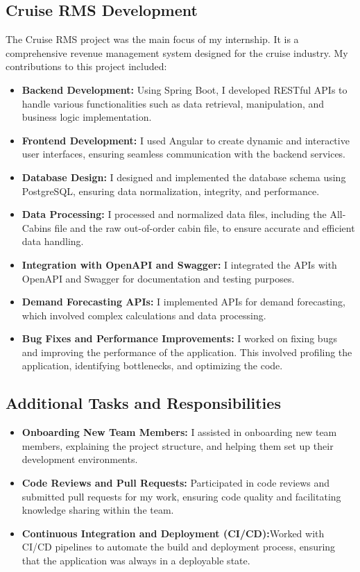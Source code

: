 \documentclass[openany, 11pt]{report} %
\begin{document}
\subsection{Cruise RMS Development}
The Cruise RMS project was the main focus of my internship. It is a comprehensive revenue management system designed for the cruise industry. My contributions to this project included:
\begin{itemize}
    \item \textbf{Backend Development:} Using Spring Boot, I developed RESTful APIs to handle various functionalities such as data retrieval, manipulation, and business logic implementation.
    \item \textbf{Frontend Development:} I used Angular to create dynamic and interactive user interfaces, ensuring seamless communication with the backend services.
    \item \textbf{Database Design:} I designed and implemented the database schema using PostgreSQL, ensuring data normalization, integrity, and performance.
    \item \textbf{Data Processing:} I processed and normalized data files, including the All-Cabins file and the raw out-of-order cabin file, to ensure accurate and efficient data handling.
    \item \textbf{Integration with OpenAPI and Swagger:} I integrated the APIs with OpenAPI and Swagger for documentation and testing purposes.
    \item \textbf{Demand Forecasting APIs:} I implemented APIs for demand forecasting, which involved complex calculations and data processing.
    \item \textbf{Bug Fixes and Performance Improvements:} I worked on fixing bugs and improving the performance of the application. This involved profiling the application, identifying bottlenecks, and optimizing the code.
\end{itemize}

\subsection{Additional Tasks and Responsibilities}
\begin{itemize}
    \item \textbf{Onboarding New Team Members:} I assisted in onboarding new team members, explaining the project structure, and helping them set up their development environments.
    \item \textbf{Code Reviews and Pull Requests:} Participated in code reviews and submitted pull requests for my work, ensuring code quality and facilitating knowledge sharing within the team.
    \item \textbf{Continuous Integration and Deployment (CI/CD):}Worked with CI/CD pipelines to automate the build and deployment process, ensuring that the application was always in a deployable state.
\end{itemize}
\end{document}
